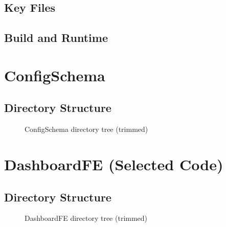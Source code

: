 \documentclass[11pt, a4paper, oneside, listof=totoc]{scrartcl}
\begin{document}
            \subsection*{Key Files}

            \subsection*{Build and Runtime}


        \cleardoublepage

        \section{ConfigSchema}\label{app:configschema}

            \subsection*{Directory Structure}
            \begin{figure}[H]
                \centering
                \caption{ConfigSchema directory tree (trimmed)}\label{fig:configschema-tree}
            \end{figure}


        \cleardoublepage

        \section{DashboardFE (Selected Code)}\label{app:dashboardfe}

            \subsection*{Directory Structure}
            \begin{figure}[H]
                \centering
                \caption{DashboardFE directory tree (trimmed)}\label{fig:dashboardfe-tree}
            \end{figure}
\end{document}
